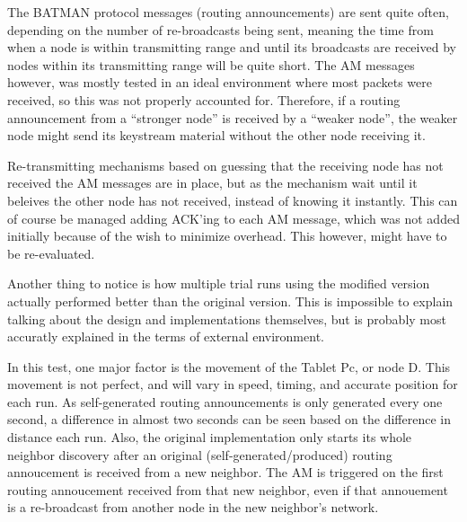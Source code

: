 The BATMAN protocol messages (routing announcements) are sent quite often,
depending on the number of re-broadcasts being sent, meaning the time from when
a node is within transmitting range and until its broadcasts are received by
nodes within its transmitting range will be quite short. The \ac{AM} messages
however, was mostly tested in an ideal environment where most packets were
received, so this was not properly accounted for. Therefore, if a routing
announcement from a ``stronger node'' is received by a ``weaker node'', the
weaker node might send its keystream material without the other node receiving
it.

Re-transmitting mechanisms based on guessing that the receiving node has not
received the \ac{AM} messages are in place, but as the mechanism wait until it
beleives the other node has not received, instead of knowing it instantly. This
can of course be managed adding ACK'ing to each \ac{AM} message, which was not
added initially because of the wish to minimize overhead. This however, might
have to be re-evaluated.

Another thing to notice is how multiple trial runs using the modified version
actually performed better than the original version. This is impossible to
explain talking about the design and implementations themselves, but is probably
most accuratly explained in the terms of external environment.

In this test, one major factor is the movement of the Tablet Pc, or node D. This
movement is not perfect, and will vary in speed, timing, and accurate position
for each run. As self-generated routing announcements is only generated every
one second, a difference in almost two seconds can be seen based on the
difference in distance each run. Also, the original implementation only starts
its whole neighbor discovery after an original (self-generated/produced) routing
annoucement is received from a new neighbor. The \ac{AM} is triggered on the
first routing annoucement received from that new neighbor, even if that
annouement is a re-broadcast from another node in the new neighbor's network.
